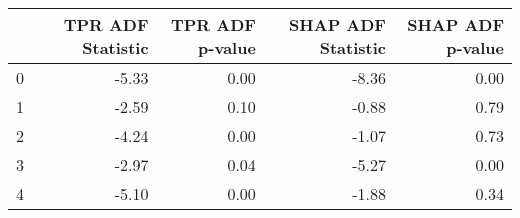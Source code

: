\begin{tabular}{lrrrr}
\toprule
 & TPR ADF Statistic & TPR ADF p-value & SHAP ADF Statistic & SHAP ADF p-value \\
\midrule
0 & -5.33 & 0.00 & -8.36 & 0.00 \\
1 & -2.59 & 0.10 & -0.88 & 0.79 \\
2 & -4.24 & 0.00 & -1.07 & 0.73 \\
3 & -2.97 & 0.04 & -5.27 & 0.00 \\
4 & -5.10 & 0.00 & -1.88 & 0.34 \\
\bottomrule
\end{tabular}
